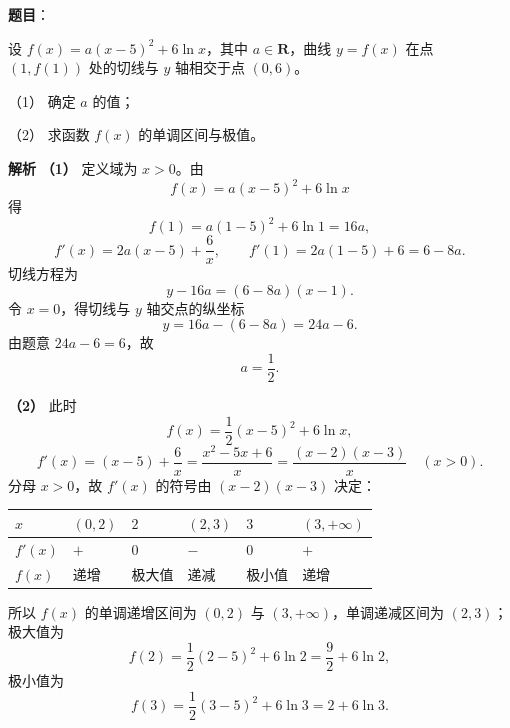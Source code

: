 \begin{answer}

\textbf{题目}：

设 $f(x)=a(x-5)^2+6\ln x$，其中 $a\in\mathbf R$，曲线 $y=f(x)$ 在点 $(1,f(1))$ 处的切线与 $y$ 轴相交于点 $(0,6)$。

（1） 确定 $a$ 的值；

（2） 求函数 $f(x)$ 的单调区间与极值。

\textbf{解析}
\textbf{（1）} 定义域为 $x>0$。由
\nopagebreak[4]
\[f(x)=a(x-5)^2+6\ln x\]
得
\nopagebreak[4]
\[f(1)=a(1-5)^2+6\ln1=16a,\]
\nopagebreak[4]
\[f'(x)=2a(x-5)+\frac6x,\qquad f'(1)=2a(1-5)+6=6-8a.\]
切线方程为
\nopagebreak[4]
\[y-16a=(6-8a)(x-1).\]
令 $x=0$，得切线与 $y$ 轴交点的纵坐标
\nopagebreak[4]
\[y=16a-(6-8a)=24a-6.\]
由题意 $24a-6=6$，故
\nopagebreak[4]
\[a=\frac12.\]

\textbf{（2）} 此时
\nopagebreak[4]
\[f(x)=\frac12(x-5)^2+6\ln x,\]
\nopagebreak[4]
\[f'(x)=(x-5)+\frac6x=\frac{x^2-5x+6}x=\frac{(x-2)(x-3)}x\quad(x>0).\]
分母 $x>0$，故 $f'(x)$ 的符号由 $(x-2)(x-3)$ 决定：

\begin{center}
\begin{tabular}{llllll}
\toprule
$x$ & $(0,2)$ & $2$ & $(2,3)$ & $3$ & $(3,+\infty)$ \\
\midrule
$f'(x)$ & $+$ & $0$ & $-$ & $0$ & $+$ \\
$f(x)$ & 递增 & 极大值 & 递减 & 极小值 & 递增 \\
\bottomrule
\end{tabular}
\end{center}

所以 $f(x)$ 的单调递增区间为 $(0,2)$ 与 $(3,+\infty)$，单调递减区间为 $(2,3)$；极大值为
\nopagebreak[4]
\[f(2)=\frac12(2-5)^2+6\ln2=\frac92+6\ln2,\]
极小值为
\nopagebreak[4]
\[f(3)=\frac12(3-5)^2+6\ln3=2+6\ln3.\]



\end{answer}
